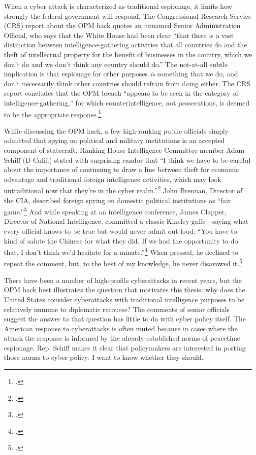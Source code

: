 \documentclass{memoir}
\begin{document}
\begin{refsegment}
When a cyber attack is characterized as traditional espionage, it limits how strongly the federal government will respond. The Congressional Research Service (CRS) report about the OPM hack quotes an unnamed Senior Administration Official, who says that the White House had been clear ``that there is a vast distinction between intelligence-gathering activities that all countries do and the theft of intellectual property for the benefit of businesses in the country, which we don't do and we don't think any country should do.'' The not-at-all subtle implication is that espionage for other purposes \emph{is} something that we do, and don't necessarily think other countries should refrain from doing either. The CRS report concludes that the OPM breach ``appears to be seen in the category of intelligence-gathering,'' for which counterintelligence, not prosecutions, is deemed to be the appropriate response.\footcite{finklea_cyber_2015}

While discussing the OPM hack, a few high-ranking public officials simply admitted that spying on political and military institutions is an accepted component of statecraft. Ranking House Intelligence Committee member Adam Schiff (D-Calif.) stated with surprising candor that ``I think we have to be careful about the importance of continuing to draw a line between theft for economic advantage and traditional foreign intelligence activities, which may look untraditional now that they’re in the cyber realm.''\footcite{nakashima_hacks_2015} John Brennan, Director of the CIA, described foreign spying on domestic political institutions as ``fair game.''\footcite{sanger_u.s._2016} And while speaking at an intelligence conference, James Clapper, Director of National Intelligence, committed a classic Kinsley gaffe---saying what every official knows to be true but would never admit out loud: ``You have to kind of salute the Chinese for what they did. If we had the opportunity to do that, I don't think we'd hesitate for a minute.''\footcite{pepitone_clapper_2015} When pressed, he declined to repeat the comment, but, to the best of my knowledge, he never disavowed it.\footcite{sanger_u.s._2015}

There have been a number of high-profile cyberattacks in recent years, but the OPM hack best illustrates the question that motivates this thesis: why does the United States consider cyberattacks with traditional intelligence purposes to be relatively immune to diplomatic recourse? The comments of senior officials suggest the answer to that question has little to do with cyber policy itself. The American response to cyberattacks is often muted because in cases where the attack the response is informed by the already-established norms of peacetime espionage. Rep. Schiff makes it clear that policymakers are interested in porting those norms to cyber policy; I want to know whether they should.


\end{refsegment}
\end{document}
